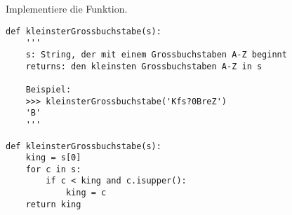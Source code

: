 \question[4]  Implementiere die Funktion.

\begin{lstlisting}
def kleinsterGrossbuchstabe(s):
    '''
    s: String, der mit einem Grossbuchstaben A-Z beginnt
    returns: den kleinsten Grossbuchstaben A-Z in s

    Beispiel:
    >>> kleinsterGrossbuchstabe('Kfs?0BreZ')
    'B'
    '''
\end{lstlisting}
\begin{solutionbox}{10cm}
\begin{lstlisting}
def kleinsterGrossbuchstabe(s):
    king = s[0]
    for c in s:
        if c < king and c.isupper():
            king = c
    return king
\end{lstlisting}
\end{solutionbox}
